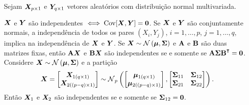 \begin{theorem}[Independência]
	Sejam $\bm{X}_{p\times 1}$ e $\bm{Y}_{q\times 1}$ vetores aleatórios com distribuição normal multivariada.
	\begin{outline}[enumerate]
		\1 $\bm{X}$ e $\bm{Y}$ são independentes $\iff \operatorname{Cov}[\bm{X},\bm{Y}] = \mathbf{0}$.
		\1 Se $\bm{X}$ e $\bm{Y}$ são conjuntamente normais, a independência de todos os pares $(X_i,Y_j)$, $i=1,\ldots,p$, $j=1,\ldots,q$, implica na independência de $\bm{X}$ e $\bm{Y}$.
		\1 Se $\v{X}\sim\normdist{\v{\mu},\m{\Sigma}}$ e $\mathbf{A}$ e $\mathbf{B}$ são duas matrizes fixas, então $\mathbf{A}\bm{X}$ e $\mathbf{B}\bm{X}$ são independentes se e somente se $\m{A}\m{\Sigma}\m{B}\T = \m{0}$.
		\1 Considere $\v{X}\sim\normdist{\v{\mu},\m{\Sigma}}$ e a partição
		\begin{equation}
			\v{X} =
			\begin{bmatrix}
				\v{X}_{1(q\times 1)} \\
				\v{X}_{2((p-q)\times 1)}
			\end{bmatrix}
			\sim \normdist[p]{
				\begin{bmatrix}
					\v{\mu}_{1(q\times 1)} \\
					\v{\mu}_{2((p-q)\times 1)}
				\end{bmatrix},
				\begin{bmatrix}
					\m{\Sigma}_{11} & \m{\Sigma}_{12} \\
					\m{\Sigma}_{21} & \m{\Sigma}_{22}
				\end{bmatrix}
			}.
		\end{equation}
		Então $\bm{X}_1$ e $\bm{X}_2$ são independentes se e somente se $\mathbf{\Sigma}_{12} = \mathbf{0}$.
	\end{outline}
\end{theorem}

